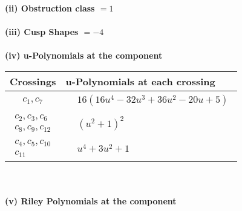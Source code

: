 \documentclass[1p]{elsarticle_modified}
\theoremstyle{definition}
\begin{document}
\flushleft \textbf{(ii) Obstruction class $= 1$}\\~\\
\flushleft \textbf{(iii) Cusp Shapes $= -4$}\\~\\
\newpage\renewcommand{\arraystretch}{1}
\flushleft \textbf{(iv) u-Polynomials at the component}\newline \\
\begin{tabular}{m{50pt}|m{274pt}}
Crossings & \hspace{64pt}u-Polynomials at each crossing \\
\hline $$\begin{aligned}c_{1},c_{7}\end{aligned}$$&$\begin{aligned}
&16(16 u^4-32 u^3+36 u^2-20 u+5)
\end{aligned}$\\
\hline $$\begin{aligned}c_{2},c_{3},c_{6}\\c_{8},c_{9},c_{12}\end{aligned}$$&$\begin{aligned}
&(u^2+1)^2
\end{aligned}$\\
\hline $$\begin{aligned}c_{4},c_{5},c_{10}\\c_{11}\end{aligned}$$&$\begin{aligned}
&u^4+3 u^2+1
\end{aligned}$\\
\hline
\end{tabular}\\~\\
\newpage\renewcommand{\arraystretch}{1}
\flushleft \textbf{(v) Riley Polynomials at the component}\newline \\
\end{document}
